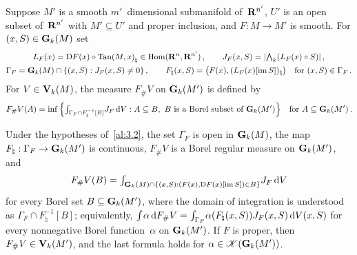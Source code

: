 \begin{definition}
    \label{al:3.2}
    Suppose $M'$ is a smooth $m'$~dimensional submanifold of~$\mathbf{R}^{n'}$, $U'$ is an open
    subset of~$\mathbf{R}^{n'}$ with $M' \subseteq U'$ and proper inclusion, and $F : M \to M'$ is
    smooth. For $(x,S) \in \mathbf{G}_{k}(M)$ set
    \begin{gather*}
        L_F(x) = \mathrm{D} F(x) \circ {\operatorname{Tan}(M,x)}_\natural \in \operatorname{Hom}(\mathbf{R}^{n},\mathbf{R}^{n'}) \,, \qquad
        J_F(x,S) = |{\textstyle\boldsymbol{\bigwedge}}_{{k}}(L_F(x) \circ S)| \,, \\
        \Gamma_F = \mathbf{G}_{k}(M) \cap \{ (x,S) : J_F(x,S) \ne 0 \} \,, \qquad F_\natural(x,S) = \big(
        F(x), (L_F(x)[\operatorname{im} S])_\natural \big) \quad \text{for $(x,S) \in \Gamma_F$} \,.
    \end{gather*}
    For $V \in \mathbf{V}_{k}(M)$, the measure $F_\# V$ on $\mathbf{G}_{k}(M')$ is defined by
    \begin{displaymath}
        F_\# V(A) = \inf \Big\{ {\textstyle\int_{\Gamma_F \cap F_\natural^{-1}[B]}^{}} J_F \,\mathrm{d} V : A \subseteq
        B,\ B \text{ is a Borel subset of } \mathbf{G}_{k}(M') \Big\} \quad \text{for $A \subseteq \mathbf{G}_{k}(M')$}
        \,.
    \end{displaymath}
\end{definition}

\begin{lemma}
    \label{al:3.2(1)}
    Under the hypotheses of~\ref{al:3.2}, the set $\Gamma_F$ is open in $\mathbf{G}_{k}(M)$, the map
    $F_\natural : \Gamma_F \to \mathbf{G}_{k}(M')$ is continuous, $F_\# V$ is a Borel regular measure on
    $\mathbf{G}_{k}(M')$, and
    \begin{equation}
        \label{eq:3.2(1):1}
        F_\# V(B) = {\textstyle\int_{\mathbf{G}_{k}(M) \cap \{ (x,S) : (F(x), \mathrm{D} F(x)[\operatorname{im} S]) \in B \}}^{}} J_F \,\mathrm{d} V
    \end{equation}
    for every Borel set $B \subseteq \mathbf{G}_{k}(M')$, where the domain of integration is understood
    as $\Gamma_F \cap F_\natural^{-1}[B]$; equivalently, ${\textstyle\int_{}^{}} \alpha \,\mathrm{d} F_\# V =
    {\textstyle\int_{\Gamma_F}^{}} \alpha(F_\natural(x,S)) J_F(x,S) \,\mathrm{d} V(x,S)$ for every nonnegative
    Borel function~$\alpha$ on $\mathbf{G}_{k}(M')$. If $F$ is proper, then $F_\# V \in
    \mathbf{V}_{k}(M')$, and the last formula holds for $\alpha \in \mathscr{K}(\mathbf{G}_{k}(M'))$.
\end{lemma}

